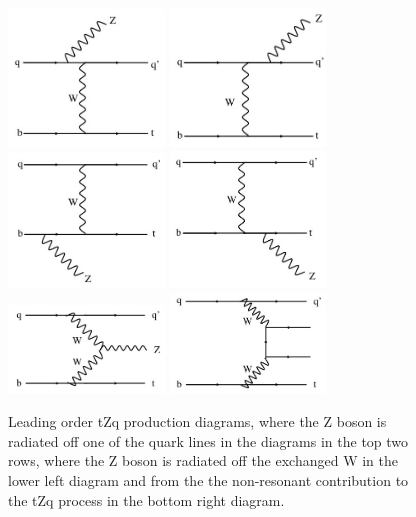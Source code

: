 \begin{figure}[htbp]
\centering
\includegraphics[width=0.37\textwidth]{figs/top-physics/tZq_feyn1.jpg}
\includegraphics[width=0.37\textwidth]{figs/top-physics/tZq_feyn2.jpg}
\includegraphics[width=0.37\textwidth]{figs/top-physics/tZq_feyn3.jpg}
\includegraphics[width=0.37\textwidth]{figs/top-physics/tZq_feyn4.jpg}
\includegraphics[width=0.37\textwidth]{figs/top-physics/tZq_feyn5.jpg}
\includegraphics[width=0.37\textwidth]{figs/top-physics/tZq_feyn6.jpg}
\caption{Leading order tZq production diagrams, where the Z boson is radiated off one of the quark lines in the diagrams in the top two rows, where the Z boson is radiated off the exchanged W in the lower left diagram and from the the non-resonant contribution to the tZq process in the bottom right diagram.}
\label{fig:feyn_tZq}
\end{figure}

